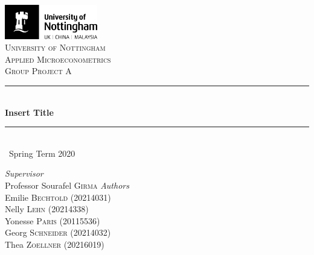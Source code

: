 \documentclass[a4paper,11pt]{scrartcl}
\newcommand{\sectionnumbering}[1]{%
  \setcounter{section}{0}%
   \renewcommand{\thesection}{\csname #1\endcsname{section}}}
\begin{document}
	\begin{titlepage}
		\newcommand{\HRule}{\rule{\linewidth}{0.5mm}}
		
	\vfill\vfill
	\includegraphics[height=1.5cm]{UoN_Logo}\\[1cm] 


	\center			
	\textsc{\LARGE University of Nottingham}\\[1.5cm] 
	\textsc{\Large Applied Microeconometrics}\\[0.5cm] 	
	\textsc{\large Group Project A}\\[0.5cm] 
	
	\HRule\\[0.4cm]
	{\huge\bfseries Insert Title}\\[0.4cm] 
	\HRule\\[0.4cm]
	
	{\large\ Spring Term 2020} 	
	\vfill\vfill\vfill 		
	
\begin{flushleft}
			\large
			\textit{Supervisor}\\
			Professor Sourafel \textsc{Girma} 
			\vfill\vfill 
			\textit{Authors}\\
			Emilie \textsc{Bechtold} (20214031)\\
			Nelly  \textsc{Lehn} (20214338)\\
			Yonesse \textsc{Paris} (20115536)\\
			Georg  \textsc{Schneider} (20214032)\\
			Thea  \textsc{Zoellner} (20216019)
		\end{flushleft}
	\vfill 
	
\end{titlepage}


\sectionnumbering{Roman}
\tableofcontents

\newpage

\listoftables
\newpage

\sectionnumbering{arabic}
\end{document}
